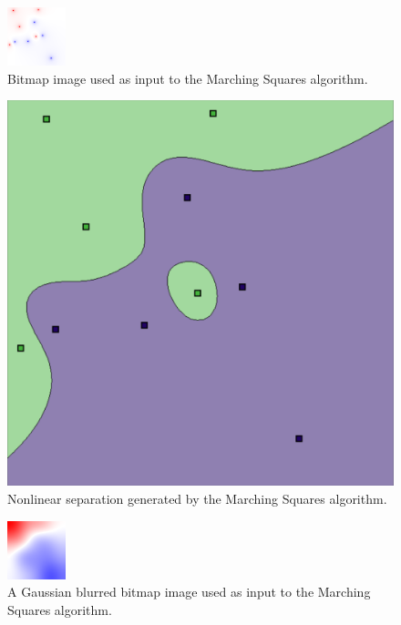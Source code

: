 \documentclass[12pt]{article}
\begin{document}
\begin{figure} 
\centering
  \includegraphics[width = 3 in]{nonlinear_image.png}
  \caption{Bitmap image used as input to the Marching Squares algorithm.
}
\end{figure}

\begin{figure} 
\centering
  \includegraphics[width = 3 in]{nonlinear.png}
  \caption{Nonlinear separation generated by the Marching Squares algorithm.
}
\end{figure}

\begin{figure} 
\centering
  \includegraphics[width = 3 in]{nonlinear_blurred_image.png}
  \caption{A Gaussian blurred bitmap image used as input to the Marching Squares algorithm.
}
\end{figure}
\end{document}
